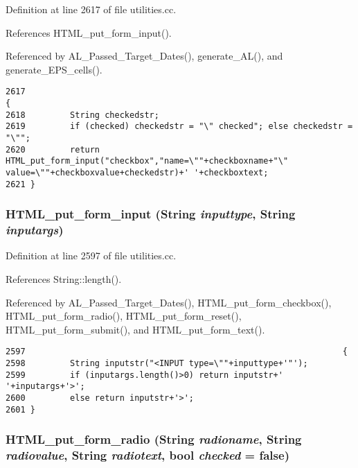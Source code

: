 Definition at line 2617 of file utilities.cc.

References HTML\_\-put\_\-form\_\-input().

Referenced by AL\_\-Passed\_\-Target\_\-Dates(), generate\_\-AL(), and generate\_\-EPS\_\-cells().



\footnotesize\begin{verbatim}2617                                                                                                                     {
2618         String checkedstr;
2619         if (checked) checkedstr = "\" checked"; else checkedstr = "\"";
2620         return HTML_put_form_input("checkbox","name=\""+checkboxname+"\" value=\""+checkboxvalue+checkedstr)+' '+checkboxtext;
2621 }
\end{verbatim}\normalsize 
{}
\subsubsection{ HTML\_\-put\_\-form\_\-input ({\bf String} {\em inputtype}, {\bf String} {\em inputargs})}\label{dil2al_8hh_a270}




Definition at line 2597 of file utilities.cc.

References String::length().

Referenced by AL\_\-Passed\_\-Target\_\-Dates(), HTML\_\-put\_\-form\_\-checkbox(), HTML\_\-put\_\-form\_\-radio(), HTML\_\-put\_\-form\_\-reset(), HTML\_\-put\_\-form\_\-submit(), and HTML\_\-put\_\-form\_\-text().



\footnotesize\begin{verbatim}2597                                                                {
2598         String inputstr("<INPUT type=\""+inputtype+'"');
2599         if (inputargs.length()>0) return inputstr+' '+inputargs+'>';
2600         else return inputstr+'>';
2601 }
\end{verbatim}\normalsize 
{}
\subsubsection{ HTML\_\-put\_\-form\_\-radio ({\bf String} {\em radioname}, {\bf String} {\em radiovalue}, {\bf String} {\em radiotext}, bool {\em checked} = {\bf false})}\label{dil2al_8hh_a273}




